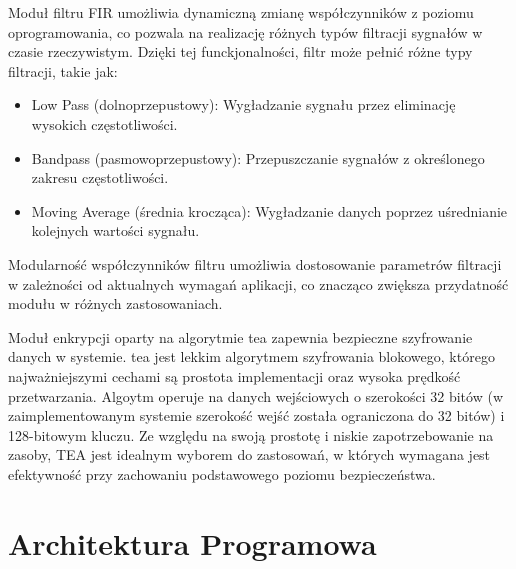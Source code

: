 Moduł filtru FIR umożliwia dynamiczną zmianę współczynników z poziomu oprogramowania, co pozwala na realizację różnych typów filtracji sygnałów w czasie rzeczywistym. Dzięki tej funckjonalności, filtr może pełnić różne typy filtracji, takie jak:

\begin{itemize}
    \item Low Pass (dolnoprzepustowy): Wygładzanie sygnału przez eliminację wysokich częstotliwości.
    \item Bandpass (pasmowoprzepustowy): Przepuszczanie sygnałów z określonego zakresu częstotliwości.
    \item Moving Average (średnia krocząca): Wygładzanie danych poprzez uśrednianie kolejnych wartości sygnału.
\end{itemize}

Modularność współczynników filtru umożliwia dostosowanie parametrów filtracji w zależności od aktualnych wymagań aplikacji, co znacząco zwiększa przydatność modułu w różnych zastosowaniach.

Moduł enkrypcji oparty na algorytmie \ac{tea} zapewnia bezpieczne szyfrowanie danych w systemie. \ac{tea} jest lekkim algorytmem szyfrowania blokowego, którego najważniejszymi cechami są prostota implementacji oraz wysoka prędkość przetwarzania. Algoytm operuje na danych wejściowych o szerokości 32 bitów (w zaimplementowanym systemie szerokość wejść została ograniczona do 32 bitów) i 128-bitowym kluczu. Ze względu na swoją prostotę i niskie zapotrzebowanie na zasoby, TEA jest idealnym wyborem do zastosowań, w których wymagana jest efektywność przy zachowaniu podstawowego poziomu bezpieczeństwa.












\newpage
\section{Architektura Programowa}
\label{sec:architektura-sw}




